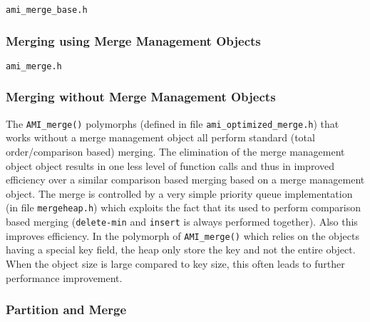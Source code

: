 \tobeextended

\verb|ami_merge_base.h|

%

\subsubsection{Merging using Merge Management Objects}

\tobeextended

\verb|ami_merge.h|

\subsubsection{Merging without Merge Management Objects}

\tobeextended

The \verb|AMI_merge()| polymorphs (defined in file
\verb|ami_optimized_merge.h|) that works without a merge management object
all perform standard (total order/comparison based) merging. The
elimination of the merge management object object results in one less level
of function calls and thus in improved efficiency over a similar comparison
based merging based on a merge management object. The merge is controlled
by a very simple priority queue implementation (in file \verb|mergeheap.h|)
which exploits the fact that its used to perform comparison based merging
(\verb|delete-min| and \verb|insert| is always performed together). Also
this improves efficiency. In the polymorph of \verb|AMI_merge()| which
relies on the objects having a special key field, the heap only store the
key and not the entire object. When the object size is large compared to
key size, this often leads to further performance improvement.

\subsubsection{Partition and Merge}

\tobeextended

